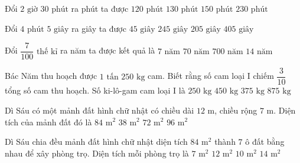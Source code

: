 \begin{ex} %
Đổi $2\text{ giờ } 30\text{ phút}$ ra phút ta được
\choice
{$120\text{ phút}$}
{$130\text{ phút}$}
{\True $150\text{ phút}$}
{$230\text{ phút}$}
\end{ex}

\begin{ex} %
Đổi $4\text{ phút } 5\text{ giây}$ ra giây ta được
\choice
{$45\text{ giây}$}
{\True $245\text{ giây}$}
{$205\text{ giây}$}
{$405\text{ giây}$}
\end{ex}

\begin{ex} %
Đổi $\dfrac{7}{100}\text{ thế kỉ}$ ra năm ta được kết quả là
\choice
{\True $7\text{ năm}$}
{$70\text{ năm}$}
{$700\text{ năm}$}
{$14\text{ năm}$}
\end{ex}

\begin{ex} %
Bác Năm thu hoạch được $1\text{ tấn } 250\text{ kg}$ cam. Biết rằng số cam loại I chiếm $\dfrac{3}{10}$ tổng số cam thu hoạch. Số ki-lô-gam cam loại I là
\choice
{$250\text{ kg}$}
{$450\text{ kg}$}
{\True $375\text{ kg}$}
{$875\text{ kg}$}
\end{ex}

\begin{ex} %
Dì Sáu có một mảnh đất hình chữ nhật có chiều dài $12\text{ m}$, chiều rộng $7\text{ m}$. Diện tích của mảnh đất đó là
\choice
{\True $84\text{ m}^2$}
{$38\text{ m}^2$}
{$72\text{ m}^2$}
{$96\text{ m}^2$}
\end{ex}

\begin{ex} %
Dì Sáu chia đều mảnh đất hình chữ nhật diện tích $84\text{ m}^2$ thành $7$ ô đất bằng nhau để xây phòng trọ. Diện tích mỗi phòng trọ là
\choice
{$7\text{ m}^2$}
{\True $12\text{ m}^2$}
{$10\text{ m}^2$}
{$14\text{ m}^2$}
\end{ex}

